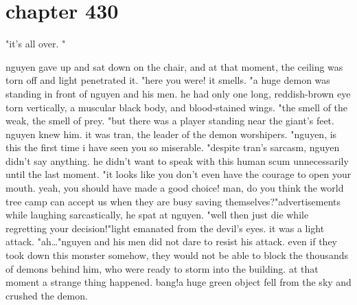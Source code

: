\section{chapter 430}

"it's all over.
"




nguyen gave up and sat down on the chair, and at that moment, the ceiling was torn off and light penetrated it.
"here you were! it smells.
"a huge demon was standing in front of nguyen and his men.
 he had only one long, reddish-brown eye torn vertically, a muscular black body, and blood-stained wings.
"the smell of the weak, the smell of prey.
"but there was a player standing near the giant's feet.
 nguyen knew him.
 it was tran, the leader of the demon worshipers.
"nguyen, is this the first time i have seen you so miserable.
"despite tran's sarcasm, nguyen didn't say anything.
 he didn't want to speak with this human scum unnecessarily until the last moment.
"it looks like you don't even have the courage to open your mouth.
 yeah, you should have made a good choice! man, do you think the world tree camp can accept us when they are busy saving themselves?"advertisements    while laughing sarcastically, he spat at nguyen.
"well then just die while regretting your decision!"light emanated from the devil's eyes.
 it was a light attack.
"ah…"nguyen and his men did not dare to resist his attack.
even if they took down this monster somehow, they would not be able to block the thousands of demons behind him, who were ready to storm into the building.
 at that moment a strange thing happened.
bang!a huge green object fell from the sky and crushed the demon.

